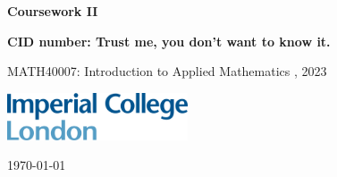 \documentclass[10pt, a4paper]{article}
\begin{document}
\begin{titlepage}
    \begin{center}
        \vspace*{3cm}
            
        \Huge
        \textbf{
        Coursework II}
            
            
        \vspace{1.5cm}
        \Large
            
        \textbf{
        CID number: Trust me, you don't want to know it.}%
        
            
        \vfill
        
    MATH40007: Introduction to Applied Mathematics , 2023
        \vspace{1cm}
            
        \includegraphics[width=0.4\textwidth]{icl_logo.png}
        \\
        
        \Large
        
        \today
            
    \end{center}
\end{titlepage}
\end{document}
